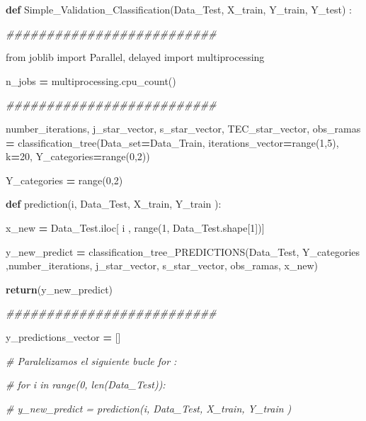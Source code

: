 \documentclass[
  11pt,
  a4paper,
]{article}
\newenvironment{Shaded}{\begin{snugshade}}{\end{snugshade}}
\newcommand{\BuiltInTok}[1]{#1}
\newcommand{\CommentTok}[1]{\textcolor[rgb]{0.56,0.35,0.01}{\textit{#1}}}
\newcommand{\ControlFlowTok}[1]{\textcolor[rgb]{0.13,0.29,0.53}{\textbf{#1}}}
\newcommand{\DecValTok}[1]{\textcolor[rgb]{0.00,0.00,0.81}{#1}}
\newcommand{\ImportTok}[1]{#1}
\newcommand{\KeywordTok}[1]{\textcolor[rgb]{0.13,0.29,0.53}{\textbf{#1}}}
\newcommand{\NormalTok}[1]{#1}
\newcommand{\OperatorTok}[1]{\textcolor[rgb]{0.81,0.36,0.00}{\textbf{#1}}}
\begin{document}
\begin{Shaded}
\begin{Highlighting}[]
\KeywordTok{def}\NormalTok{ Simple\_Validation\_Classification(Data\_Test, X\_train, Y\_train, Y\_test) :}

    \CommentTok{\#\#\#\#\#\#\#\#\#\#\#\#\#\#\#\#\#\#\#\#\#\#\#\#\#\#}

    \ImportTok{from}\NormalTok{ joblib }\ImportTok{import}\NormalTok{ Parallel, delayed}
    \ImportTok{import}\NormalTok{ multiprocessing}

\NormalTok{    n\_jobs  }\OperatorTok{=}\NormalTok{ multiprocessing.cpu\_count()}

    \CommentTok{\#\#\#\#\#\#\#\#\#\#\#\#\#\#\#\#\#\#\#\#\#\#\#\#\#\#}

\NormalTok{    number\_iterations, j\_star\_vector, s\_star\_vector, TEC\_star\_vector, obs\_ramas }\OperatorTok{=}\NormalTok{ classification\_tree(Data\_set}\OperatorTok{=}\NormalTok{Data\_Train, iterations\_vector}\OperatorTok{=}\BuiltInTok{range}\NormalTok{(}\DecValTok{1}\NormalTok{,}\DecValTok{5}\NormalTok{), k}\OperatorTok{=}\DecValTok{20}\NormalTok{, Y\_categories}\OperatorTok{=}\BuiltInTok{range}\NormalTok{(}\DecValTok{0}\NormalTok{,}\DecValTok{2}\NormalTok{))    }
    
\NormalTok{    Y\_categories }\OperatorTok{=} \BuiltInTok{range}\NormalTok{(}\DecValTok{0}\NormalTok{,}\DecValTok{2}\NormalTok{)}

    \KeywordTok{def}\NormalTok{ prediction(i, Data\_Test, X\_train, Y\_train ):}

\NormalTok{     x\_new }\OperatorTok{=}\NormalTok{ Data\_Test.iloc[ i , }\BuiltInTok{range}\NormalTok{(}\DecValTok{1}\NormalTok{, Data\_Test.shape[}\DecValTok{1}\NormalTok{])]}

\NormalTok{     y\_new\_predict }\OperatorTok{=}\NormalTok{ classification\_tree\_PREDICTIONS(Data\_Test, Y\_categories ,number\_iterations, j\_star\_vector, s\_star\_vector, obs\_ramas, x\_new)}
  
     \ControlFlowTok{return}\NormalTok{(y\_new\_predict)}

    \CommentTok{\#\#\#\#\#\#\#\#\#\#\#\#\#\#\#\#\#\#\#\#\#\#\#\#\#\#}

\NormalTok{    y\_predictions\_vector }\OperatorTok{=}\NormalTok{ []}

    \CommentTok{\# Paralelizamos el siguiente bucle for :}

    \CommentTok{\# for i in  range(0, len(Data\_Test)):}

        \CommentTok{\# y\_new\_predict = prediction(i, Data\_Test, X\_train, Y\_train )}


\end{Highlighting}
\end{Shaded}
\end{document}
